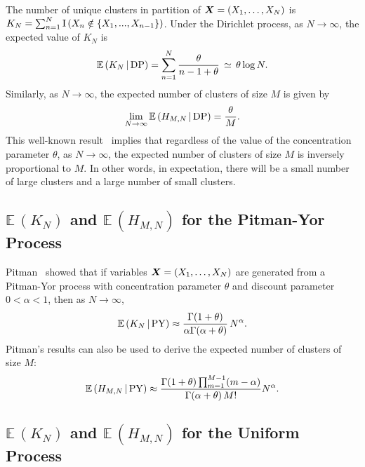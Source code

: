\documentclass{article}
\begin{document}
The number of unique clusters in partition of $\boldsymbol{X} = (X_1, \ldots,
X_N)$ is $K_N = \sum_{n=1}^N {\rm I}\, (X_n \notin \{X_1,...,X_{n -
  1}\})$. Under the Dirichlet process, as $N \to \infty$, the
expected value of $K_N$ is
\begin{equation}
\mathbb{E}\,(K_N\,|\,{\rm DP}) = \sum_{n = 1}^N \frac{\theta}{n -
  1 + \theta}  \,\simeq\, \theta \log N. \label{DPmom2}
\end{equation}
Similarly, as $N \to \infty$, the expected number of clusters of size
$M$ is given by
\begin{equation}
\lim_{N \to \infty} \mathbb{E}\,(H_{M,N}\,|\,{\rm DP}) = 
\frac{\theta}{M}.\label{DPmom1}
\end{equation}
This well-known result~\cite{ArrBarTav03} implies that regardless of
the value of the concentration parameter $\theta$, as $N \to \infty$,
the expected number of clusters of size $M$ is inversely proportional
to $M$. In other words, in expectation, there will be a small number
of large clusters and a large number of small clusters.

\subsection{$\mathbb{E}\,(K_N)$ and $\mathbb{E}\,(H_{M,N})$ for the
  Pitman-Yor Process} \label{PY_asymptotic}

Pitman~\cite{Pit02} showed that if variables $\boldsymbol{X} = (X_1,\ldots, X_N)$
are generated from a Pitman-Yor process with concentration parameter
$\theta$ and discount parameter $0 < \alpha < 1$, then as $N \to
\infty$,
\begin{equation}
\mathbb{E}\,(K_N \,|\,{\rm PY}) \approx \frac{\Gamma(1 + \theta)}{
  \alpha\Gamma(\alpha +
\theta)} \,N^{\alpha}. \label{PYmom2}
\end{equation}
Pitman's results can also be used to derive the expected number of
clusters of size $M$:
\begin{equation}
\mathbb{E}\,(H_{M,N} \,|\,{\rm PY}) \approx \frac{\Gamma(1 +
  \theta) \prod_{m=1}^{M-1} (m - \alpha)}{\Gamma(\alpha +
\theta)\,  M!} N^{\alpha}.  \label{PYmom4}
\end{equation}

\subsection{$\mathbb{E}\,(K_N)$ and $\mathbb{E}\,(H_{M,N})$ for the
  Uniform Process}\label{UN_asymptotic}
\end{document}
